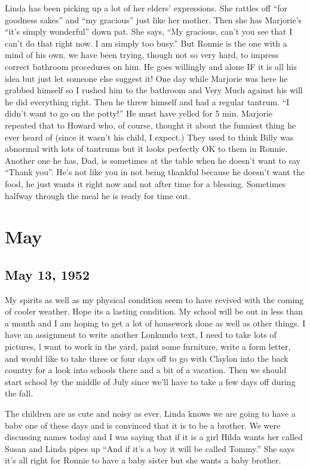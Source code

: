 \documentclass[
]{book}
\begin{document}
Linda has been picking up a lot of her elders' expressions. She rattles off ``for goodness sakes'' and ``my gracious'' just like her mother. Then she has Marjorie's ``it's simply wonderful'' down pat. She says, ``My gracious, can't you see that I can't do that right now. I am simply too busy.'' But Ronnie is the one with a mind of his own. we have been trying, though not so very hard, to impress correct bathroom procedures on him. He goes willingly and alone IF it is all his idea but just let someone else suggest it! One day while Marjorie was here he grabbed himself so I rushed him to the bathroom and Very Much against his will he did everything right. Then he threw himself and had a regular tantrum. ``I didn't want to go on the potty!'' He must have yelled for 5 min. Marjorie repeated that to Howard who, of course, thought it about the funniest thing he ever heard of (since it wasn't his child, I expect.) They used to think Billy was abnormal with lots of tantrums but it looks perfectly OK to them in Ronnie. Another one he has, Dad, is sometimes at the table when he doesn't want to say ``Thank you''. He's not like you in not being thankful because he doesn't want the food, he just wants it right now and not after time for a blessing. Sometimes halfway through the meal he is ready for time out.

\hypertarget{may-3}{%
\section{May}\label{may-3}}

\hypertarget{may-13-1952}{%
\subsection{May 13, 1952}\label{may-13-1952}}

My spirits as well as my physical condition seem to have revived with the coming of cooler weather. Hope its a lasting condition. My school will be out in less than a month and I am hoping to get a lot of housework done as well as other things. I have an assignment to write another Lonkundo text, I need to take lots of pictures, l want to work in the yard, paint some furniture, write a form letter, and would like to take three or four days off to go with Claylon into the back country for a look into schools there and a bit of a vacation. Then we should start school by the middle of July since we'll have to take a few days off during the fall.

The children are as cute and noisy as ever. Linda knows we are going to have a babv one of these days and is convinced that it is to be a brother. We were discussing names today and I was saying that if it is a girl Hilda wants her called Susan and Linda pipes up ``And if it's a boy it will be called Tommy.'' She says it's all right for Ronnie to have a baby sister but she wants a baby brother.
\end{document}
